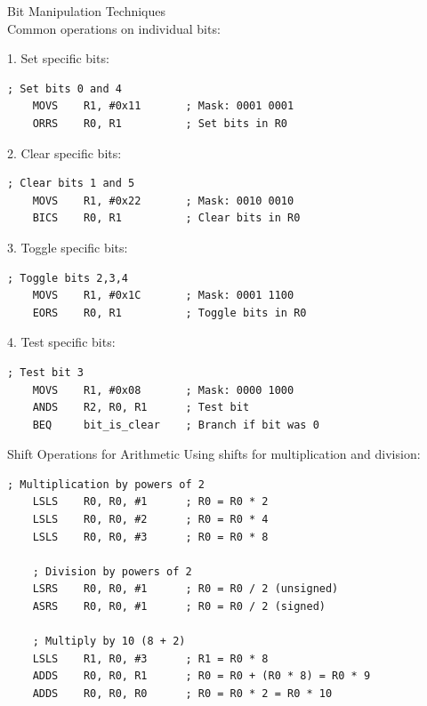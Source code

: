 \begin{KR}{Bit Manipulation Techniques}\\
Common operations on individual bits:

1. Set specific bits:
\begin{lstlisting}[language=armasm, style=base]
    ; Set bits 0 and 4
    MOVS    R1, #0x11       ; Mask: 0001 0001
    ORRS    R0, R1          ; Set bits in R0
\end{lstlisting}

2. Clear specific bits:
\begin{lstlisting}[language=armasm, style=base]
    ; Clear bits 1 and 5
    MOVS    R1, #0x22       ; Mask: 0010 0010
    BICS    R0, R1          ; Clear bits in R0
\end{lstlisting}

3. Toggle specific bits:
\begin{lstlisting}[language=armasm, style=base]
    ; Toggle bits 2,3,4
    MOVS    R1, #0x1C       ; Mask: 0001 1100
    EORS    R0, R1          ; Toggle bits in R0
\end{lstlisting}

4. Test specific bits:
\begin{lstlisting}[language=armasm, style=base]
    ; Test bit 3
    MOVS    R1, #0x08       ; Mask: 0000 1000
    ANDS    R2, R0, R1      ; Test bit
    BEQ     bit_is_clear    ; Branch if bit was 0
\end{lstlisting}
\end{KR}

\begin{example2}{Shift Operations for Arithmetic}
Using shifts for multiplication and division:
\begin{lstlisting}[language=armasm, style=base]
    ; Multiplication by powers of 2
    LSLS    R0, R0, #1      ; R0 = R0 * 2
    LSLS    R0, R0, #2      ; R0 = R0 * 4
    LSLS    R0, R0, #3      ; R0 = R0 * 8
    
    ; Division by powers of 2
    LSRS    R0, R0, #1      ; R0 = R0 / 2 (unsigned)
    ASRS    R0, R0, #1      ; R0 = R0 / 2 (signed)
    
    ; Multiply by 10 (8 + 2)
    LSLS    R1, R0, #3      ; R1 = R0 * 8
    ADDS    R0, R0, R1      ; R0 = R0 + (R0 * 8) = R0 * 9
    ADDS    R0, R0, R0      ; R0 = R0 * 2 = R0 * 10
\end{lstlisting}
\end{example2}


